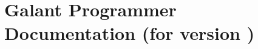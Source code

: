 \documentclass{article}
\begin{document}
\section{Galant Programmer Documentation (for version \VERSION)}


\end{document}

